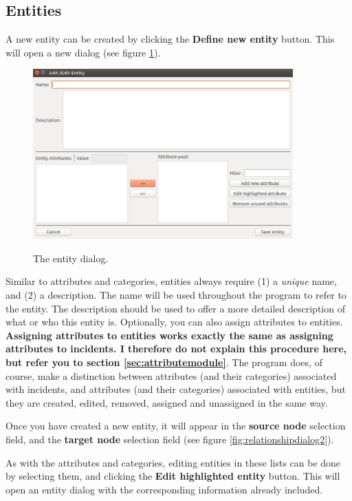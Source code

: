 \documentclass{memoir}
\begin{document}
\subsection{Entities}
\label{sec:entities}

A new entity can be created by clicking the \textbf{Define new entity} button. This will open a new dialog (see figure \ref{fig:entitydialog}).

\begin{figure}[h!]
  \centering
  \caption{The entity dialog.}
  \includegraphics[width=100mm]{Screenshot_16.pdf}
  \label{fig:entitydialog}
\end{figure}

Similar to attributes and categories, entities always require (1) a \emph{unique} name, and (2) a description. The name will be used throughout the program to refer to the entity. The description should be used to offer a more detailed description of what or who this entity is. Optionally, you can also assign attributes to entities. \textbf{Assigning attributes to entities works exactly the same as assigning attributes to incidents. I therefore do not explain this procedure here, but refer you to section \ref{sec:attributemodule}}. The program does, of course, make a distinction between attributes (and their categories) associated with incidents, and attributes (and their categories) associated with entities, but they are created, edited, removed, assigned and unassigned in the same way.  

Once you have created a new entity, it will appear in the \textbf{source node} selection field, and the \textbf{target node} selection field (see figure \ref{fig:relationshipdialog2}).

As with the attributes and categories, editing entities in these lists can be done by selecting them, and clicking the \textbf{Edit highlighted entity} button. This will open an entity dialog with the corresponding information already included. 
\end{document}
